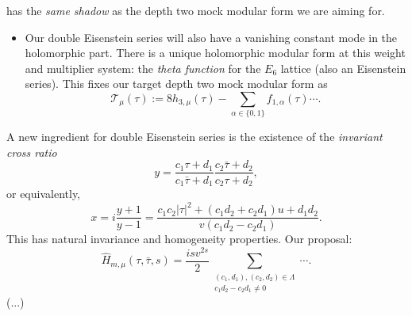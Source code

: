 \documentclass[reqno]{amsart} 
\numberwithin{theorem}{section}
\numberwithin{equation}{section}
\begin{document}
has the \emph{same shadow} as the depth two mock modular form we are aiming for.
\begin{itemize}
\item Our double Eisenstein series will also have a vanishing constant mode in the holomorphic part.  There is a unique holomorphic modular form at this weight and multiplier system: the \emph{theta function} for the $E_6$ lattice (also an Eisenstein series).  This fixes our target depth two mock modular form as
  \begin{equation*}
    \mathcal{T}_\mu(\tau) := 8 h_{3 , \mu}(\tau) - \sum_{\alpha \in \{0, 1\}}
    f_{1, \alpha}(\tau) \dotsb.
  \end{equation*}
\end{itemize}
A new ingredient for double Eisenstein series is the existence of the \emph{invariant cross ratio}
\begin{equation*}
  y = \frac{c_1 \tau + d_1}{c_1 \bar{\tau} + d_1}
  \frac{c_2 \bar{\tau} + d_2}{ c_2 \tau + d_2},
\end{equation*}
or equivalently,
\begin{equation}\label{eq:cnrbhnjf3e}
  x = i \frac{y + 1}{y - 1}
  = \frac{c_1 c_2 \lvert \tau \rvert^2 +(c_1 d_2 + c_2 d_1) u + d_1 d_2}{ v(c_1 d_2 - c_2 d_1)}.
\end{equation}
This has natural invariance and homogeneity properties.  Our proposal:
\begin{equation*}
  \hat{H}_{m, \mu}(\tau, \bar{\tau}, s) = \frac{i s v^{2 s}}{2}
  \sum_{
    \substack{
      (c_1 , d_1), (c_2, d_2) \in \Lambda  \\
      c_1 d_2 - c_2 d_1 \neq 0      
    }
  }
  \dotsb.
\end{equation*}
(...)
\end{document}
